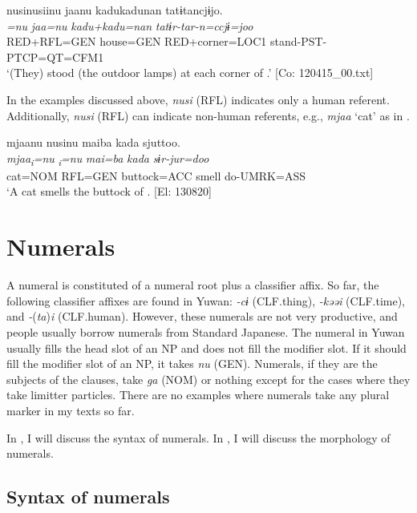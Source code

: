 \glll  nusinusiinu  jaanu  kadukadunan  tatɨtancjɨjo.\\
\textit{=nu}  \textit{jaa=nu}  \textit{kadu+kadu=nan}  \textit{tatɨr-tar-n=ccjɨ=joo}\\
RED+RFL=GEN  house=GEN  RED+corner=LOC1  stand-PST-PTCP=QT=CFM1\\
\glt ‘(They) stood (the outdoor lamps) at each corner of .’ [Co: 120415\_00.txt]
\z

  In the examples discussed above, \textit{nusi} (RFL) indicates only a human referent. Additionally, \textit{nusi} (RFL) can indicate non-human referents, e.g., \textit{mjaa} ‘cat’ as in .

\ea \label{ex:7:11}  %
\glll  mjaanu  nusinu  maiba  kada  sjuttoo.\\
\textit{mjaa\textsubscript{i}}\textit{=nu}  \textit{\textsubscript{i}}\textit{=nu}  \textit{mai=ba}  \textit{kada}  \textit{sɨr-jur=doo}\\
cat=NOM  RFL=GEN  buttock=ACC  smell  do-UMRK=ASS\\
\glt ‘A cat smells the buttock of . [El: 130820]
\z

\section{Numerals}

A numeral is constituted of a numeral root plus a classifier affix. So far, the following classifier affixes are found in Yuwan: \textit{{}-cɨ} (CLF.thing), \textit{{}-kəəi} (CLF.time), and \textit{{}-}(\textit{ta})\textit{i} (CLF.human). However, these numerals are not very productive, and people usually borrow numerals from Standard Japanese. The numeral in Yuwan usually fills the head slot of an NP and does not fill the modifier slot. If it should fill the modifier slot of an NP, it takes \textit{nu} (GEN). Numerals, if they are the subjects of the clauses, take \textit{ga} (NOM) or nothing except for the cases where they take limitter particles. There are no examples where numerals take any plural marker in my texts so far.

  In , I will discuss the syntax of numerals. In , I will discuss the morphology of numerals.

\subsection{Syntax of numerals}

